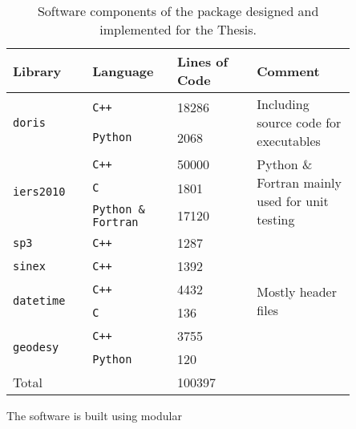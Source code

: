 \begin{table}[h!]
    \centering
    \begin{tabular}{p{0.20\linewidth} | p{0.2\linewidth} | p{0.20\linewidth} | p{0.25\linewidth}}
        \hline
        \textbf{Library} & \textbf{Language} & \textbf{Lines of Code} & \textbf{Comment}\\
        \hline
        \multirow{2}{*}{\texttt{doris}}  & \texttt{C++} & 18286 & \multirow{2}{4cm}{Including source code for executables}\\
          & \texttt{Python} & 2068 & \\
        \hline
        \multirow{3}{*}{\texttt{iers2010}}  & \texttt{C++} & 50000 & \multirow{3}{4cm}{Python \& Fortran mainly used for unit testing} \\
          & \texttt{C} & 1801 \\
          & \texttt{Python \& Fortran} &  17120 \\
        \hline
        \texttt{sp3}    & \texttt{C++} & 1287 & \\
        \hline
        \texttt{sinex}  & \texttt{C++} & 1392 & \\
        \hline
        \multirow{2}{*}{\texttt{datetime}}  & \texttt{C++} & 4432 & \multirow{2}{*}{Mostly header files}\\
          & \texttt{C}      & 136 \\
        \hline
        \multirow{2}{*}{\texttt{geodesy}}  & \texttt{C++} & 3755 & \multirow{2}{*}{}\\
          & \texttt{Python} & 120 \\
        \hline
        Total & & 100397\\
        \hline
    \end{tabular}
    \caption{Software components of the package designed and implemented for the Thesis.}
    \label{table:software-components}
\end{table}

The software is built using modular
